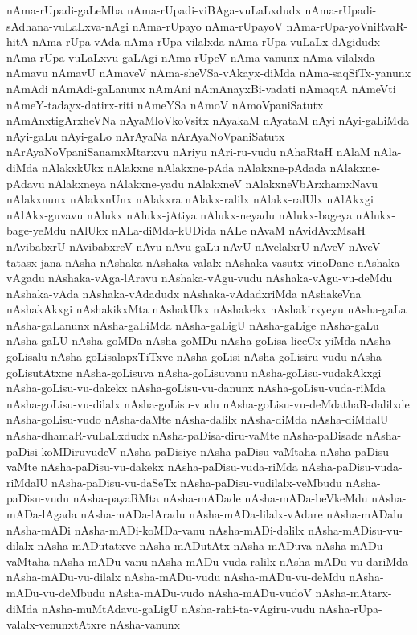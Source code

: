 {nAma-rUpadi-gaLeMba
nAma-rUpadi-viBAga-vuLaLxdudx
nAma-rUpadi-sAdhana-vuLaLxva-nAgi
nAma-rUpayo
nAma-rUpayoV
nAma-rUpa-yoVniRvaR-hitA
nAma-rUpa-vAda
nAma-rUpa-vilalxda
nAma-rUpa-vuLaLx-dAgidudx
nAma-rUpa-vuLaLxvu-gaLAgi
nAma-rUpeV
nAma-vanunx
nAma-vilalxda
nAmavu
nAmavU
nAmaveV
nAma-sheVSa-vAkayx-diMda
nAma-saqSiTx-yanunx
nAmAdi
nAmAdi-gaLanunx
nAmAni
nAmAnayxBi-vadati
nAmaqtA
nAmeVti
nAmeY-tadayx-datirx-riti
nAmeYSa
nAmoV
nAmoVpaniSatutx
nAmAnxtigArxheVNa
nAyaMloVkoVsitx
nAyakaM
nAyataM
nAyi
nAyi-gaLiMda
nAyi-gaLu
nAyi-gaLo
nArAyaNa
nArAyaNoVpaniSatutx
nArAyaNoVpaniSanamxMtarxvu
nAriyu
nAri-ru-vudu
nAhaRtaH
nAlaM
nAla-diMda
nAlakxkUkx
nAlakxne
nAlakxne-pAda
nAlakxne-pAdada
nAlakxne-pAdavu
nAlakxneya
nAlakxne-yadu
nAlakxneV
nAlakxneVbArxhamxNavu
nAlakxnunx
nAlakxnUnx
nAlakxra
nAlakx-ralilx
nAlakx-ralUlx
nAlAkxgi
nAlAkx-guvavu
nAlukx
nAlukx-jAtiya
nAlukx-neyadu
nAlukx-bageya
nAlukx-bage-yeMdu
nAlUkx
nALa-diMda-kUDida
nALe
nAvaM
nAvidAvxMsaH
nAvibabxrU
nAvibabxreV
nAvu
nAvu-gaLu
nAvU
nAvelalxrU
nAveV
nAveV-tatasx-jana
nAsha
nAshaka
nAshaka-valalx
nAshaka-vasutx-vinoDane
nAshaka-vAgadu
nAshaka-vAga-lAravu
nAshaka-vAgu-vudu
nAshaka-vAgu-vu-deMdu
nAshaka-vAda
nAshaka-vAdadudx
nAshaka-vAdadxriMda
nAshakeVna
nAshakAkxgi
nAshakikxMta
nAshakUkx
nAshakekx
nAshakirxyeyu
nAsha-gaLa
nAsha-gaLanunx
nAsha-gaLiMda
nAsha-gaLigU
nAsha-gaLige
nAsha-gaLu
nAsha-gaLU
nAsha-goMDa
nAsha-goMDu
nAsha-goLisa-liceCx-yiMda
nAsha-goLisalu
nAsha-goLisalapxTiTxve
nAsha-goLisi
nAsha-goLisiru-vudu
nAsha-goLisutAtxne
nAsha-goLisuva
nAsha-goLisuvanu
nAsha-goLisu-vudakAkxgi
nAsha-goLisu-vu-dakekx
nAsha-goLisu-vu-danunx
nAsha-goLisu-vuda-riMda
nAsha-goLisu-vu-dilalx
nAsha-goLisu-vudu
nAsha-goLisu-vu-deMdathaR-dalilxde
nAsha-goLisu-vudo
nAsha-daMte
nAsha-dalilx
nAsha-diMda
nAsha-diMdalU
nAsha-dhamaR-vuLaLxdudx
nAsha-paDisa-diru-vaMte
nAsha-paDisade
nAsha-paDisi-koMDiruvudeV
nAsha-paDisiye
nAsha-paDisu-vaMtaha
nAsha-paDisu-vaMte
nAsha-paDisu-vu-dakekx
nAsha-paDisu-vuda-riMda
nAsha-paDisu-vuda-riMdalU
nAsha-paDisu-vu-daSeTx
nAsha-paDisu-vudilalx-veMbudu
nAsha-paDisu-vudu
nAsha-payaRMta
nAsha-mADade
nAsha-mADa-beVkeMdu
nAsha-mADa-lAgada
nAsha-mADa-lAradu
nAsha-mADa-lilalx-vAdare
nAsha-mADalu
nAsha-mADi
nAsha-mADi-koMDa-vanu
nAsha-mADi-dalilx
nAsha-mADisu-vu-dilalx
nAsha-mADutatxve
nAsha-mADutAtx
nAsha-mADuva
nAsha-mADu-vaMtaha
nAsha-mADu-vanu
nAsha-mADu-vuda-ralilx
nAsha-mADu-vu-dariMda
nAsha-mADu-vu-dilalx
nAsha-mADu-vudu
nAsha-mADu-vu-deMdu
nAsha-mADu-vu-deMbudu
nAsha-mADu-vudo
nAsha-mADu-vudoV
nAsha-mAtarx-diMda
nAsha-muMtAdavu-gaLigU
nAsha-rahi-ta-vAgiru-vudu
nAsha-rUpa-valalx-venunxtAtxre
nAsha-vanunx
}
